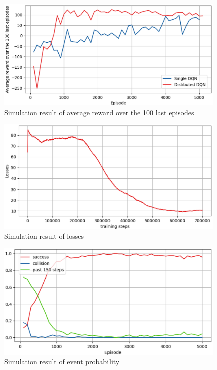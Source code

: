 \documentclass[12pt]{sonota/aislab}
\begin{document}
\begin{figure}[t]
\begin{center}
\includegraphics[clip, width=11cm]{figs/result_multi_reward.eps}
\caption{Simulation result of average reward over the 100 last episodes}
\label{result_reward}
\end{center}
\end{figure}

\begin{figure}[t]
\begin{center}
\includegraphics[clip, width=11cm]{figs/result_multi_loss.eps}
\caption{Simulation result of losses}
\label{result_loss}
\end{center}
\end{figure}

\begin{figure}[t]
\begin{center}
\includegraphics[clip, width=11cm]{figs/result_multi_probability.eps}
\caption{Simulation result of event probability}
\label{result_probability}
\end{center}
\end{figure}
\end{document}
